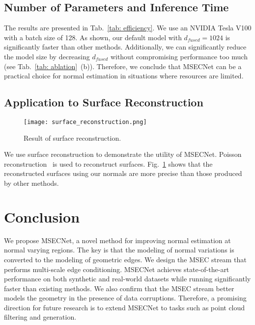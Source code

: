 \documentclass[sigconf]{acmart}
\begin{document}
\subsection{Number of Parameters and Inference Time}\label{sec: efficienncy}
The results are presented in Tab.~\ref{tab: efficiency}. We use an NVIDIA Tesla V100 with a batch size of 128. As shown, our default model with $d_{fused}=1024$ is significantly faster than other methods. Additionally, we can significantly reduce the model size by decreasing $d_{fused}$ without compromising performance too much (see Tab.~\ref{tab: ablation}~(b)). Therefore, we conclude that MSECNet can be a practical choice for normal estimation in situations where resources are limited.

\subsection{Application to Surface Reconstruction}\label{sec: surface reconstruction}

\begin{figure}[tb]
  \centering
  \texttt{[image: surface\_reconstruction.png]}
  \caption{Result of surface reconstruction.}
  \Description{}
  \label{fig: reconstruction}
\end{figure}



We use surface reconstruction to demonstrate the utility of MSECNet. Poisson reconstruction~\cite{kazhdan2006poisson} is used to reconstruct surfaces. Fig.~\ref{fig: reconstruction} shows that the reconstructed surfaces using our normals are more precise than those produced by other methods.

\section{Conclusion}
We propose MSECNet, a novel method for improving normal estimation at normal varying regions. The key is that the modeling of normal variations is converted to the modeling of geometric edges. We design the MSEC stream that performs multi-scale edge conditioning. MSECNet achieves state-of-the-art performance on both synthetic and real-world datasets while running significantly faster than existing methods. We also confirm that the MSEC stream better models the geometry in the presence of data corruptions. Therefore, a promising direction for future research is to extend MSECNet to tasks such as point cloud filtering and generation.  
\end{document}
